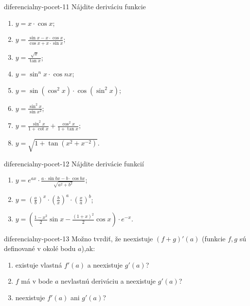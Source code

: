 \begin{defproblem}{diferencialny-pocet-11}
Nájdite deriváciu funkcie
\begin{multicols}{2}
\begin{enumerate}
    \item $y=x\cdot\cos x$;
    \item $y=\frac{\sin x-x\cdot\cos x}{\cos x+x\cdot\sin x}$;
    \item $y=\frac{\sqrt{x}}{\tan x}$;
    \item $y=\sin^n x\cdot\cos nx$;
    \item $y=\sin (\cos^2 x)\cdot \cos (\sin^2 x)$;
    \item $y=\frac{\sin^2 x}{\sin x^2}$;
    \item $y=\frac{\sin^2 x}{1+\cot x}+\frac{\cos^2 x}{1+\tan x}$;
    \item $y=\sqrt{1+\tan (x^2+x^{-2})}$.
\end{enumerate}
\end{multicols}
\end{defproblem}

\begin{defproblem}{diferencialny-pocet-12}
Nájdite derivácie funkcií
\begin{enumerate}
\item $y = e^{ax} \cdot \frac{a \cdot \sin{bx} - b \cdot \cos{bx}}{\sqrt{a^2+b^2}}$;
\item $y = (\frac{a}{b})^x \cdot (\frac{b}{x})^a \cdot (\frac{x}{a})^b$;
\item $y = (\frac{1-x^2}{2} \sin{x} - \frac{(1+x)^2}{2} \cos{x}) \cdot e^{-x}$.
\end{enumerate}
\end{defproblem}

\begin{defproblem}{diferencialny-pocet-13}
Možno tvrdiť, že neexistuje $(f+g)'(a)$ (funkcie $f,g$ sú definované v okolé bodu $a$),ak:
\begin{enumerate}
\item existuje vlastná $f'(a)$ a neexistuje $g'(a)$?
\item $f$ má v bode $a$ nevlastnú deriváciu a neexistuje $g'(a)$?
\item neexistuje $f'(a)$ ani $g'(a)$?
\end{enumerate}
\end{defproblem}

